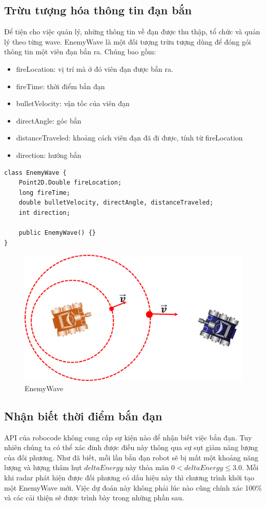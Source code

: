 \documentclass[14pt]{article}
\begin{document}
\subsection{Trừu tượng hóa thông tin đạn bắn}
Để tiện cho việc quản lý, những thông tin về đạn được thu thập, tổ chức và quản lý theo từng wave. EnemyWave là một đối tượng trừu tượng dùng để đóng gói thông tin một viên đạn bắn ra. Chúng bao gồm:
	\begin{itemize}
		\item fireLocation: vị trí mà ở đó viên đạn được bắn ra.
		\item fireTime: thời điểm bắn đạn
		\item bulletVelocity: vận tốc của viên đạn
		\item directAngle: góc bắn
		\item distanceTraveled: khoảng cách viên đạn đã đi được, tính từ fireLocation
		\item direction: hướng bắn
	\end{itemize}
\begin{lstlisting}[caption = EnemyWave, frame = single]
class EnemyWave {
	Point2D.Double fireLocation;
	long fireTime;
	double bulletVelocity, directAngle, distanceTraveled;
	int direction;

	public EnemyWave() {}
}
\end{lstlisting}
\begin{figure}[H]
\centering
\includegraphics[scale=0.5]{images/wavesurfing_introduction.png}
\caption{EnemyWave}
\end{figure}
\subsection{Nhận biết thời điểm bắn đạn}
API của robocode không cung cấp sự kiện nào để nhận biết việc bắn đạn. Tuy nhiên chúng ta có thể xác đinh được điều này thông qua sự sụt giảm năng lượng của đối phương. Như đã biết, mỗi lần bắn đạn robot sẽ bị mất một khoảng năng lượng và lượng thâm hụt $deltaEnergy$ này thỏa mãn $0 < deltaEnergy \leq 3.0$. Mỗi khi radar phát hiện được đối phương có dấu hiệu này thì chương trình khởi tạo một EnemyWave mới. Việc dự đoán này không phải lúc nào cũng chính xác 100\% và các cải thiện sẽ được trình bày trong những phần sau.
\end{document}
